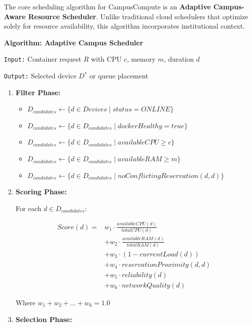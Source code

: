 \documentclass[12pt,a4paper]{article}
\begin{document}
The core scheduling algorithm for CampusCompute is an \textbf{Adaptive Campus-Aware Resource Scheduler}. Unlike traditional cloud schedulers that optimize solely for resource availability, this algorithm incorporates institutional context.

\textbf{Algorithm: Adaptive Campus Scheduler}

\texttt{Input:} Container request $R$ with CPU $c$, memory $m$, duration $d$

\texttt{Output:} Selected device $D^*$ or queue placement

\begin{enumerate}
    \item \textbf{Filter Phase:}
    \begin{itemize}
        \item $D_{candidates} \leftarrow \{d \in Devices \mid status = ONLINE\}$
        \item $D_{candidates} \leftarrow \{d \in D_{candidates} \mid dockerHealthy = true\}$
        \item $D_{candidates} \leftarrow \{d \in D_{candidates} \mid availableCPU \geq c\}$
        \item $D_{candidates} \leftarrow \{d \in D_{candidates} \mid availableRAM \geq m\}$
        \item $D_{candidates} \leftarrow \{d \in D_{candidates} \mid noConflictingReservation(d, d)\}$
    \end{itemize}
    
    \item \textbf{Scoring Phase:}
    
    For each $d \in D_{candidates}$:
    
    \begin{align*}
    Score(d) = & w_1 \cdot \frac{availableCPU(d)}{totalCPU(d)} \\
             & + w_2 \cdot \frac{availableRAM(d)}{totalRAM(d)} \\
             & + w_3 \cdot (1 - currentLoad(d)) \\
             & + w_4 \cdot reservationProximity(d, d) \\
             & + w_5 \cdot reliability(d) \\
             & + w_6 \cdot networkQuality(d)
    \end{align*}
    
    Where $w_1 + w_2 + ... + w_6 = 1.0$
    
    \item \textbf{Selection Phase:}
    

\end{enumerate}
\end{document}
